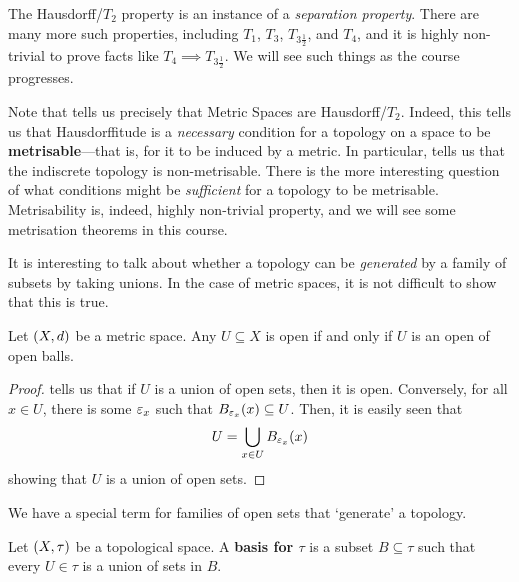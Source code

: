 The Hausdorff/$T_2$ property is an instance of a \textit{separation property}. There are many more such properties, including $T_1$, $T_3$, $T_{3 \frac{1}{2}}$, and $T_4$, and it is highly non-trivial to prove facts like $T_4 \implies T_{3 \frac{1}{2}}$. We will see such things as the course progresses.

Note that  tells us precisely that Metric Spaces are Hausdorff/$T_2$. Indeed, this tells us that Hausdorffitude is a \textit{necessary} condition for a topology on a space to be \textbf{metrisable}---that is, for it to be induced by a metric. In particular,  tells us that the indiscrete topology is non-metrisable. There is the more interesting question of what conditions might be \textit{sufficient} for a topology to be metrisable. Metrisability is, indeed, highly non-trivial property, and we will see some metrisation theorems in this course.

It is interesting to talk about whether a topology can be \textit{generated} by a family of subsets by taking unions. In the case of metric spaces, it is not difficult to show that this is true.

\begin{boxproposition}\label{Ch1:Prop:Met_Top_gen_by_open_balls}
    Let $\left( X, d \right)$ be a metric space. Any $U \subseteq X$ is open if and only if $U$ is an open of open balls.
\end{boxproposition}
\begin{proof}
     tells us that if $U$ is a union of open sets, then it is open. Conversely, for all $x \in U$, there is some $\varepsilon_x$ such that $B_{\varepsilon_x}(x) \subseteq U$. Then, it is easily seen that
    \begin{align*}
        U = \bigcup_{x \in U} B_{\varepsilon_x}(x)
    \end{align*}
    showing that $U$ is a union of open sets.
\end{proof}

We have a special term for families of open sets that `generate' a topology.

\begin{boxdefinition}
    Let $\left( X, \tau \right)$ be a topological space. A \textbf{basis for $\tau$} is a subset $B \subseteq \tau$ such that every $U \in \tau$ is a union of sets in $B$.
\end{boxdefinition}


